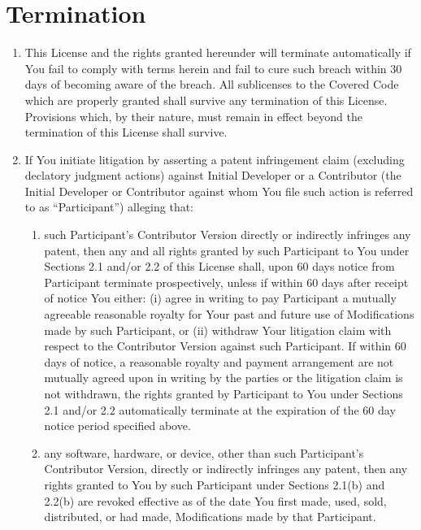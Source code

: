 \documentclass{book}
\begin{document}
\section{Termination}
\begin{enumerate}
\renewcommand{\theenumi}{\arabic{section}.\arabic{enumi}}
\item This License and the rights granted hereunder will terminate automatically if You fail to comply with terms herein and fail to cure such breach within 30 days of becoming aware of the breach. All sublicenses to the Covered Code which are properly granted shall survive any termination of this License. Provisions which, by their nature, must remain in effect beyond the termination of this License shall survive. 

\item If You initiate litigation by asserting a patent infringement claim (excluding declatory judgment actions) against Initial Developer or a Contributor (the Initial Developer or Contributor against whom You file such action is referred to as ``Participant'') alleging that: 

\renewcommand{\theenumii}{\alph{enumii}}
  \begin{enumerate}
  \item such Participant's Contributor Version directly or indirectly infringes any patent, then any and all rights granted by such Participant to You under Sections 2.1 and/or 2.2 of this License shall, upon 60 days notice from Participant terminate prospectively, unless if within 60 days after receipt of notice You either: (i) agree in writing to pay Participant a mutually agreeable reasonable royalty for Your past and future use of Modifications made by such Participant, or (ii) withdraw Your litigation claim with respect to the Contributor Version against such Participant. If within 60 days of notice, a reasonable royalty and payment arrangement are not mutually agreed upon in writing by the parties or the litigation claim is not withdrawn, the rights granted by Participant to You under Sections 2.1 and/or 2.2 automatically terminate at the expiration of the 60 day notice period specified above. 

\item any software, hardware, or device, other than such Participant's Contributor Version, directly or indirectly infringes any patent, then any rights granted to You by such Participant under Sections 2.1(b) and 2.2(b) are revoked effective as of the date You first made, used, sold, distributed, or had made, Modifications made by that Participant. 
  \end{enumerate}


\end{enumerate}
\end{document}
